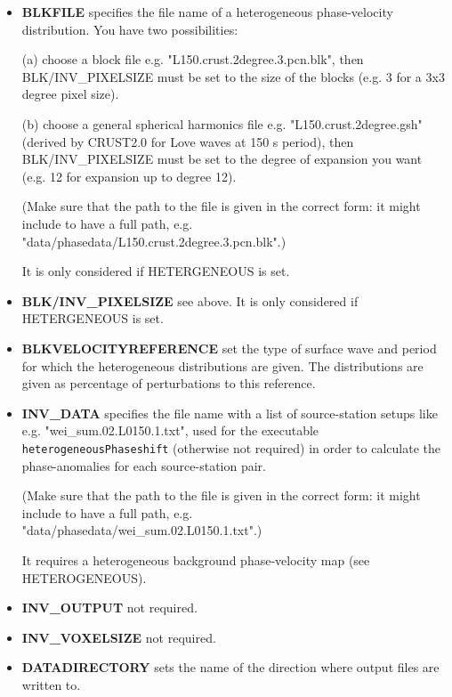 \documentclass[a4paper,
                          headsepline,
                          listof=totoc,
                          toc=listof,
                          headings=small]{scrreprt} %
\begin{document}
\begin{itemize}
\item \textbf{BLKFILE}
specifies the file name of a heterogeneous phase-velocity distribution.
You have two possibilities:

(a) choose a block file e.g. "L150.crust.2degree.3.pcn.blk", then BLK/INV\_PIXELSIZE must be set to the size of the blocks (e.g. 3 for a 3x3 degree pixel size).

(b) choose a general spherical harmonics file e.g. "L150.crust.2degree.gsh" (derived by CRUST2.0 for Love waves at 150 s period), then BLK/INV\_PIXELSIZE must be set to the degree of expansion you want (e.g. 12 for expansion up to degree 12).

(Make sure that the path to the file is given in the correct form: it might include to have a full path, e.g.\\
"data/phasedata/L150.crust.2degree.3.pcn.blk".)

It is only considered if HETERGENEOUS is set.

\item \textbf{BLK/INV\_PIXELSIZE}
see above. It is only considered if HETERGENEOUS is set.

\item \textbf{BLKVELOCITYREFERENCE}
set the type of surface wave and period for which the heterogeneous distributions
are given. The distributions are given as percentage of perturbations to this reference.

\item \textbf{INV\_DATA}
specifies the file name with a list of source-station setups
like e.g. "wei\_sum.02.L0150.1.txt",
used for the executable \texttt{heterogeneousPhaseshift} (otherwise not required)
in order to calculate the phase-anomalies for each source-station pair.

(Make sure that the path to the file is given in the correct form: it might include to have a full path, e.g.\\
"data/phasedata/wei\_sum.02.L0150.1.txt".)


It requires a heterogeneous background phase-velocity map
(see HETEROGENEOUS).


\item \textbf{INV\_OUTPUT}
not required.

\item \textbf{INV\_VOXELSIZE}
not required.



\item \textbf{DATADIRECTORY}
sets the name of the direction where output files are written to.


\end{itemize}
\end{document}
